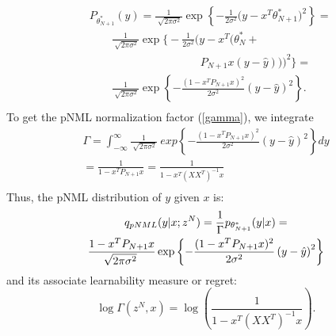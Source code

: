 \documentclass[conference,letterpaper]{IEEEtran}
\begin{document}
\begin{equation}
\begin{split}
&P_{\theta_{N+1}^*}(y) 
=\frac{1}{\sqrt[]{2\pi\sigma^2}}\exp\left\{-\frac{1}{2\sigma^2}\big(y- x^T\theta_{N+1}^* \big)^2\right\} = \\
& \qquad \frac{1}{\sqrt[]{2\pi\sigma^2}}\exp\bigg\{-\frac{1}{2\sigma^2}\big(y - x^T \big(\theta^*_{N} + \\ 
& \qquad \qquad \qquad \qquad \qquad P_{N+1} x (y -\hat{y}) \big) \big)^2\bigg\} = \\
& \qquad \frac{1}{\sqrt[]{2\pi\sigma^2}}
\exp\left\{-\frac{(1 - x^T P_{N+1} x )^2 }{2\sigma^2}\left(y-\hat{y} \right)^2\right\}.  \\
\end{split}
\end{equation}
To get the pNML normalization factor (\ref{gamma}), we integrate
\begin{multline}
\Gamma = %
\int_{-\infty}^{\infty} \frac{1}{\sqrt[]{2\pi\sigma^2}}
\ exp\left\{-\frac{(1 - x^T P_{N+1} x )^2 }{2\sigma^2}
\left(y- \hat{y} \right)^2\right\} dy\\ 
=\frac{1}{1 - x^T P_{N+1} x } 
=\frac{1}{1 - x^T (XX^T)^{-1} x } \\
\end{multline}
Thus, the pNML distribution of $y$ given $x$ is:
\begin{multline}
q_{\mbox{\tiny{pNML}}}(y | x; z^N) = \frac{1}{\Gamma}p_{\theta_{N+1}^*}(y|x) = \\
\frac{1 - x^T P_{N+1} x }{\sqrt[]{2\pi\sigma^2}}
\exp\left\{-\frac{(1 - x^T P_{N+1} x )^2 }{2\sigma^2}\left(y-\hat{y} \right)^2\right\} \\
\end{multline}
and its associate learnability measure or regret:
\begin{equation} \label{eq:regret}
\log \Gamma (z^N,x) = \log\left(\frac{1}{1 - x^T (XX^T)^{-1} x } \right).
\end{equation}
\end{document}
